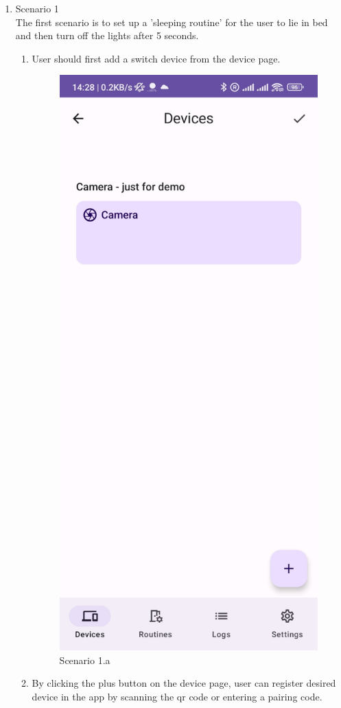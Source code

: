 \begin{enumerate}
    \item Scenario 1 \\
    The first scenario is to set up a 'sleeping routine' for the user to lie in bed and then turn off the lights after 5 seconds.\\
    \begin{enumerate}
        \item User should first add a switch device from the device page. \\
        \begin{figure}
            \centering
            \includegraphics[width=0.5\linewidth]{imgs//usercase/usercase_scenario1_1.jpg}
            \caption{Scenario 1.a}
            \label{fig:enter-label}
        \end{figure}
        \item By clicking the plus button on the device page, user can register desired device in the app by scanning the qr code or entering a pairing code.\\
        \begin{figure}
            \centering

\end{figure}
\end{enumerate}
\end{enumerate}
